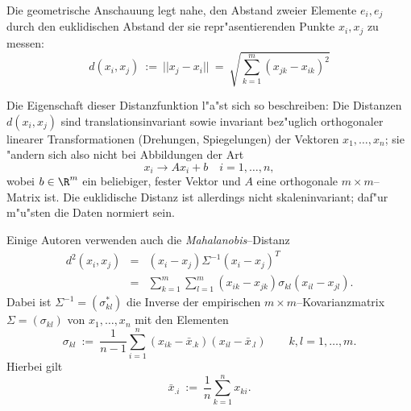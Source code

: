 Die geometrische Anschauung legt nahe, den Abstand zweier Elemente
$e_i, e_j$ durch den euklidischen Abstand der sie repr"asentierenden
Punkte $x_i, x_j$ zu messen:
\[ d(x_i, x_j) \ := \ || x_j - x_i || \ = \ 
	\sqrt{ \sum_{k=1}^m (x_{jk} - x_{ik})^2} \]

Die Eigenschaft dieser Distanzfunktion l"a"st sich so beschreiben:
Die Distanzen $d(x_i, x_j)$ sind translationsinvariant sowie
invariant bez"uglich orthogonaler linearer Transformationen 
(Drehungen, Spiegelungen) der Vektoren $x_1,\dots,x_n$; sie 
"andern sich also nicht bei Abbildungen der Art
\[ x_i \to A x_i + b \quad i = 1,\dots,n, \]
wobei $b \in \R^m$ ein beliebiger, fester Vektor und $A$ eine
orthogonale $m \times m$--Matrix ist.
Die euklidische Distanz ist allerdings nicht skaleninvariant;
daf"ur m"u"sten die Daten normiert sein.

Einige Autoren verwenden auch die {\em Mahalanobis}--Distanz
\begin{eqnarray*}
	d^2 (x_i,x_j) & = & (x_i -x_j) \Sigma^{-1} (x_i - x_j)^T \\
				  & = & \sum_{k=1}^m \sum_{l=1}^m (x_{ik} - x_{jk})
					\sigma_{kl} (x_{il} - x_{jl}).
\end{eqnarray*}
Dabei ist $\Sigma^{-1} = (\sigma^\ast_{kl})$ die Inverse der empirischen
$m\times m$--Kovarianzmatrix $\Sigma = (\sigma_{kl})$ von
$x_1,\dots,x_n$ mit den Elementen
\[ \sigma_{kl} \ := \ \frac 1{n-1} \sum _{i=1}^n (x_{ik} - \bar x _{.k})
	(x_{il} - \bar x _{.l})\qquad k,l = 1,\dots,m. \]
Hierbei gilt
\[ \bar x_{.i} \ := \ \frac 1 n \sum_{k=1}^n x_{ki}. \]

